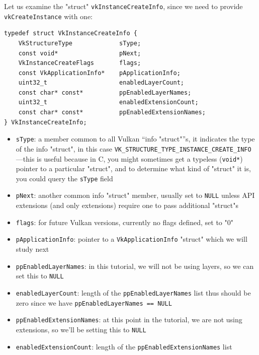 \documentclass[12pt,letterpaper]{article}
\newcommand{\inquotes}[1]{``#1''}	%
\newcommand{\cil}[1]{\texttt{#1}}
\begin{document}
Let us examine the "struct" \cil{vkInstanceCreateInfo}, since we need to provide \cil{vkCreateInstance} with one:
		\begin{verbatim}
typedef struct VkInstanceCreateInfo {
	VkStructureType             sType;
	const void*                 pNext;
	VkInstanceCreateFlags       flags;
	const VkApplicationInfo*    pApplicationInfo;
	uint32_t                    enabledLayerCount;
	const char* const*          ppEnabledLayerNames;
	uint32_t                    enabledExtensionCount;
	const char* const*          ppEnabledExtensionNames;
} VkInstanceCreateInfo;
		\end{verbatim}
		\begin{itemize}
			\item \cil{sType}: a member common to all Vulkan \inquotes{info "struct"}s, it indicates the type of the info "struct", in this case \cil{VK_STRUCTURE_TYPE_INSTANCE_CREATE_INFO}---this is useful because in C, you might sometimes get a typeless (\cil{void*}) pointer to a particular "struct", and to determine what kind of "struct" it is, you could query the \cil{sType} field
			
			\item \cil{pNext}: another common info "struct" member, usually set to \cil{NULL} unless API extensions (and only extensions) require one to pass additional "struct"s
			
			\item \cil{flags}: for future Vulkan versions, currently no flags defined, set to "0"
			
			\item \cil{pApplicationInfo}: pointer to a \cil{VkApplicationInfo} "struct" which we will study next
			
			\item \cil{ppEnabledLayerNames}: in this tutorial, we will not be using layers, so we can set this to \cil{NULL}
			
			\item \cil{enabledLayerCount}: length of the \cil{ppEnabledLayerNames} list thus should be zero since we have \cil{ppEnabledLayerNames == NULL}
			
			\item \cil{ppEnabledExtensionNames}: at this point in the tutorial, we are not using extensions, so we'll be setting this to \cil{NULL}
			
			\item \cil{enabledExtensionCount}: length of the \cil{ppEnabledExtensionNames} list
		\end{itemize}
\end{document}
